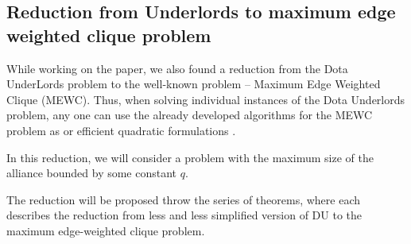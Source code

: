 \documentclass{article}
\begin{document}
\subsection{Reduction from Underlords to maximum edge weighted clique problem}
While working on the paper, we also found a reduction from the Dota UnderLords problem to the well-known problem -- Maximum Edge Weighted Clique (MEWC). Thus, when solving individual instances of the Dota Underlords problem, any one can use the already developed algorithms for the MEWC problem as \cite{san2019new} or efficient quadratic formulations    \cite{hosseinian2017maximum}.

In this reduction, we will consider a problem with the maximum size of the alliance bounded by some constant $q$.

The reduction will be proposed throw the series of theorems, where each describes the reduction from less and  less simplified version of DU to the maximum edge-weighted clique problem.
\end{document}
